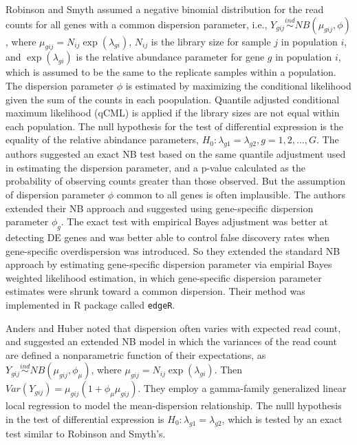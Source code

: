 Robinson and Smyth \citep{robinson2007moderated} assumed a negative binomial distribution for the read counts for all genes with a common dispersion parameter, i.e., $Y_{gij} \stackrel{ind}{\sim} NB(\mu_{gij},\phi)$, where $\mu_{gij}=N_{ij}\exp(\lambda_{gi})$, $N_{ij}$ is the library size for sample $j$ in population $i$, and $\exp(\lambda_{gi})$ is the relative abundance parameter for gene $g$ in population $i$, which is assumed to be the same to the replicate samples within a population. The dispersion parameter $\phi$ is estimated by maximizing the conditional likelihood given the sum of the counts in each poopulation. Quantile adjusted conditional maximum likelihood (qCML) is applied if the library sizes are not equal within each population. The null hypothesis for the test of differential expression is the equality of the relative abindance parameters, $H_0: \lambda_{g1} = \lambda_{g2}, g=1,2,...,G$. The authors suggested an exact NB test based on the same quantile adjustment used in estimating the dispersion parameter, and a p-value calculated as the probability of observing counts greater than those observed\citep{lorenz2014using}. But the assumption of dispersion parameter $\phi$ common to all genes is often implausible. The authors extended their NB approach and suggested using gene-specific dispersion parameter $\phi_g$\citep{robinson2007small}. The exact test with empirical Bayes adjustment was better at detecting DE genes and was better able to control false discovery rates when gene-specific overdispersion was introduced\citep{lorenz2014using}. So they extended the standard NB approach by estimating gene-specific dispersion parameter via empirial Bayes weighted likelihood estimation, in which gene-specific dispersion parameter estimates were shrunk toward a common dispersion. Their method was implemented in R package called {\tt edgeR}. 


Anders and Huber \citep{anders2010differential} noted that dispersion often varies with expected read count, and suggested an extended NB model in which the variances of the read count are defined a nonparametric function of their expectations, as $Y_{gij} \stackrel{ind}{\sim} NB(\mu_{gij}, \phi_\mu)$, where $\mu_{gij}=N_{ij}\exp(\lambda_{gi})$. Then $Var(Y_{gij}) = \mu_{gij}(1+\phi_\mu \mu_{gij})$. They employ a gamma-family generalized linear local regression to model the mean-dispersion relationship. The nulll hypothesis in the test of differential expression is $H_0: \lambda_{g1} = \lambda_{g2}$, which is tested by an exact test similar to Robinson and Smyth's.





